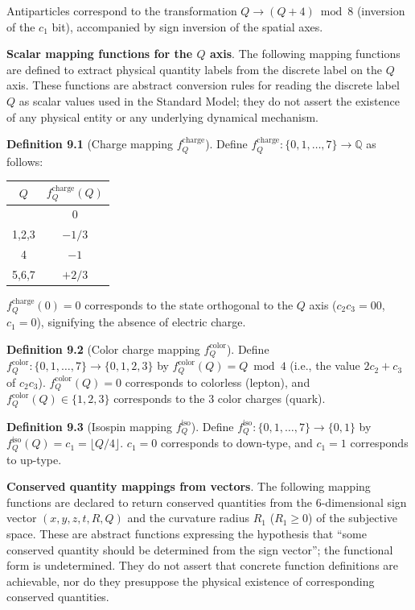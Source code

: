 \documentclass[
  a4paper,11pt]{article}
\newcounter{none}
\theoremstyle{definition}
\theoremstyle{remark}
\begin{document}
Antiparticles correspond to the transformation \(Q \to (Q + 4) \bmod 8\)
(inversion of the \(c_1\) bit), accompanied by sign inversion of the
spatial axes.

\textbf{Scalar mapping functions for the \(Q\) axis}. The following
mapping functions are defined to extract physical quantity labels from
the discrete label on the \(Q\) axis. These functions are abstract
conversion rules for reading the discrete label \(Q\) as scalar values
used in the Standard Model; they do not assert the existence of any
physical entity or any underlying dynamical mechanism.

\textbf{Definition 9.1} (Charge mapping \(f_Q^{\text{charge}}\)). Define
\(f_Q^{\text{charge}}: \{0, 1, \ldots, 7\} \to \mathbb{Q}\) as follows:

{\def\LTcaptype{none} %
\begin{longtable}[]{@{}cc@{}}
\toprule\noalign{}
\(Q\) & \(f_Q^{\text{charge}}(Q)\) \\
\midrule\noalign{}
\endhead
\bottomrule\noalign{}
\endlastfoot
0 & \(0\) \\
1,2,3 & \(-1/3\) \\
4 & \(-1\) \\
5,6,7 & \(+2/3\) \\
\end{longtable}
}

\(f_Q^{\text{charge}}(0) = 0\) corresponds to the state orthogonal to
the \(Q\) axis (\(c_2 c_3 = 00\), \(c_1 = 0\)), signifying the absence
of electric charge.

\textbf{Definition 9.2} (Color charge mapping \(f_Q^{\text{color}}\)).
Define \(f_Q^{\text{color}}: \{0, 1, \ldots, 7\} \to \{0, 1, 2, 3\}\) by
\(f_Q^{\text{color}}(Q) = Q \bmod 4\) (i.e., the value \(2c_2 + c_3\) of
\(c_2 c_3\)). \(f_Q^{\text{color}}(Q) = 0\) corresponds to colorless
(lepton), and \(f_Q^{\text{color}}(Q) \in \{1, 2, 3\}\) corresponds to
the 3 color charges (quark).

\textbf{Definition 9.3} (Isospin mapping \(f_Q^{\text{iso}}\)). Define
\(f_Q^{\text{iso}}: \{0, 1, \ldots, 7\} \to \{0, 1\}\) by
\(f_Q^{\text{iso}}(Q) = c_1 = \lfloor Q / 4 \rfloor\). \(c_1 = 0\)
corresponds to down-type, and \(c_1 = 1\) corresponds to up-type.

\textbf{Conserved quantity mappings from vectors}. The following mapping
functions are declared to return conserved quantities from the
6-dimensional sign vector \((x, y, z, t, R, Q)\) and the curvature
radius \(R_1\) (\(R_1 \geq 0\)) of the subjective space. These are
abstract functions expressing the hypothesis that ``some conserved
quantity should be determined from the sign vector''; the functional
form is undetermined. They do not assert that concrete function
definitions are achievable, nor do they presuppose the physical
existence of corresponding conserved quantities.
\end{document}
